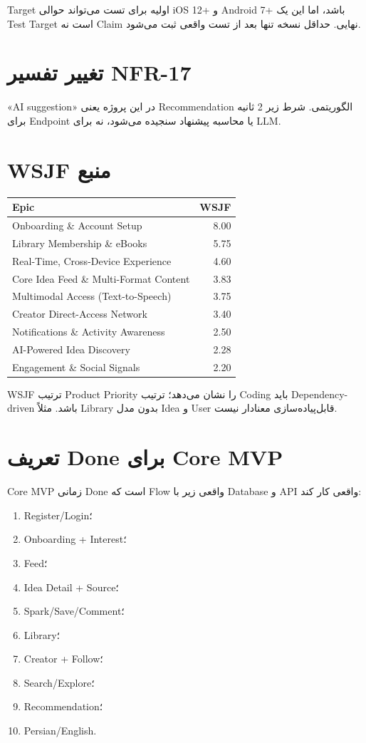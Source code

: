 Target اولیه برای تست می‌تواند حوالی iOS 12+ و Android 7+ باشد، اما این یک Test Target است نه Claim نهایی. حداقل نسخه تنها بعد از تست واقعی ثبت می‌شود.

\section{تغییر تفسیر NFR-17}

\begin{decisionbox}
«AI suggestion» در این پروژه یعنی Recommendation الگوریتمی. شرط زیر 2 ثانیه برای Endpoint یا محاسبه پیشنهاد سنجیده می‌شود، نه برای LLM.
\end{decisionbox}

\section{WSJF منبع}

\begin{longtable}{p{6.5cm}r}
\toprule
\textbf{Epic} & \textbf{WSJF} \\
\midrule
Onboarding \& Account Setup & 8.00 \\
Library Membership \& eBooks & 5.75 \\
Real-Time, Cross-Device Experience & 4.60 \\
Core Idea Feed \& Multi-Format Content & 3.83 \\
Multimodal Access (Text-to-Speech) & 3.75 \\
Creator Direct-Access Network & 3.40 \\
Notifications \& Activity Awareness & 2.50 \\
AI-Powered Idea Discovery & 2.28 \\
Engagement \& Social Signals & 2.20 \\
\bottomrule
\end{longtable}

WSJF ترتیب Product Priority را نشان می‌دهد؛ ترتیب Coding باید Dependency-driven باشد. مثلاً Library بدون مدل Idea و User قابل‌پیاده‌سازی معنادار نیست.

\section{تعریف Done برای Core MVP}

Core MVP زمانی Done است که Flow واقعی زیر با Database و API واقعی کار کند:
\begin{enumerate}
  \item Register/Login؛
  \item Onboarding + Interest؛
  \item Feed؛
  \item Idea Detail + Source؛
  \item Spark/Save/Comment؛
  \item Library؛
  \item Creator + Follow؛
  \item Search/Explore؛
  \item Recommendation؛
  \item Persian/English.
\end{enumerate}
